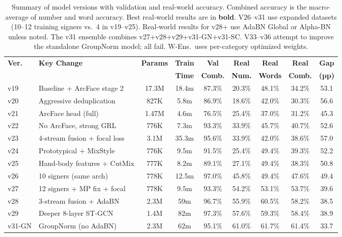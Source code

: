 \documentclass[conference]{IEEEtran}
\begin{document}
\begin{table}[t]
\centering
\caption{Summary of model versions with validation and real-world accuracy. Combined accuracy is the macro-average of number and word accuracy. Best real-world results are in \textbf{bold}. V26--v31 use expanded datasets (10--12 training signers vs.\ 4 in v19--v25). Real-world results for v28+ use AdaBN Global or Alpha-BN unless noted. The v31 ensemble combines v27+v28+v29+v31-GN+v31-SC. V33--v36 attempt to improve the standalone GroupNorm model; all fail. W-Ens.\ uses per-category optimized weights.}
\label{tab:version_summary}
\small
\begin{tabular}{@{}llccccccc@{}}
\toprule
\textbf{Ver.} & \textbf{Key Change} & \textbf{Params} & \textbf{Train} & \textbf{Val} & \textbf{Real} & \textbf{Real} & \textbf{Real} & \textbf{Gap} \\
 & & & \textbf{Time} & \textbf{Comb.} & \textbf{Num.} & \textbf{Words} & \textbf{Comb.} & \textbf{(pp)} \\
\midrule
v19 & Baseline + ArcFace stage 2 & 17.3M & 18.4m & 87.3\% & 20.3\% & 48.1\% & 34.2\% & 53.1 \\
v20 & Aggressive deduplication & 827K & 5.8m & 86.9\% & 18.6\% & 42.0\% & 30.3\% & 56.6 \\
v21 & ArcFace head (full) & 1.47M & 4.6m & 76.5\% & 25.4\% & 37.0\% & 31.2\% & 45.3 \\
v22 & No ArcFace, strong GRL & 776K & 7.3m & 93.3\% & 33.9\% & 45.7\% & 40.7\% & 52.6 \\
v23 & 4-stream fusion + focal loss & 3.1M & 35.3m & 95.6\% & 33.9\% & 42.0\% & 38.6\% & 57.0 \\
v24 & Prototypical + MixStyle & 776K & 9.5m & 91.5\% & 25.4\% & 49.4\% & 39.3\% & 52.2 \\
v25 & Hand-body features + CutMix & 777K & 8.2m & 89.1\% & 27.1\% & 49.4\% & 38.3\% & 50.8 \\
\midrule
v26 & 10 signers (same arch) & 778K & 12.5m & 97.0\% & 45.8\% & 49.4\% & 47.6\% & 49.4 \\
v27 & 12 signers + MP fix + focal & 778K & 9.5m & 93.3\% & 54.2\% & 53.1\% & 53.7\% & 39.6 \\
v28 & 3-stream fusion + AdaBN & 2.3M & 59m & 96.7\% & 55.9\% & 60.5\% & 58.2\% & 38.5 \\
v29 & Deeper 8-layer ST-GCN & 1.4M & 82m & 97.3\% & 57.6\% & 59.3\% & 58.4\% & 38.9 \\
v31-GN & GroupNorm (no AdaBN) & 2.3M & 62m & 95.1\% & 61.0\% & 61.7\% & 61.4\% & 33.7 \\

\end{tabular}
\end{table}
\end{document}
